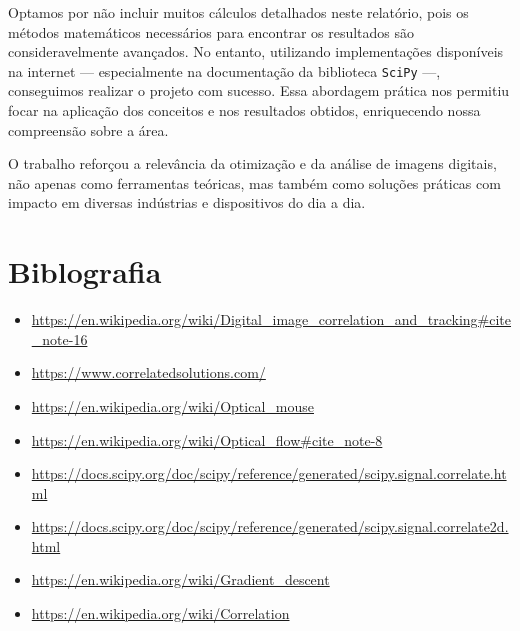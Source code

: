 \documentclass[a4paper,12pt]{article}
\begin{document}
Optamos por não incluir muitos cálculos detalhados neste relatório, pois os métodos matemáticos necessários para encontrar os resultados são consideravelmente avançados. No entanto, utilizando implementações disponíveis na internet — especialmente na documentação da biblioteca \texttt{SciPy} —, conseguimos realizar o projeto com sucesso. Essa abordagem prática nos permitiu focar na aplicação dos conceitos e nos resultados obtidos, enriquecendo nossa compreensão sobre a área. 

O trabalho reforçou a relevância da otimização e da análise de imagens digitais, não apenas como ferramentas teóricas, mas também como soluções práticas com impacto em diversas indústrias e dispositivos do dia a dia.

\section{Biblografia}
\begin{itemize}
    \item \url{https://en.wikipedia.org/wiki/Digital_image_correlation_and_tracking#cite_note-16}
    \item \url{https://www.correlatedsolutions.com/}
    \item \url{https://en.wikipedia.org/wiki/Optical_mouse}
    \item \url{https://en.wikipedia.org/wiki/Optical_flow#cite_note-8}
    \item \url{https://docs.scipy.org/doc/scipy/reference/generated/scipy.signal.correlate.html}
    \item \url{https://docs.scipy.org/doc/scipy/reference/generated/scipy.signal.correlate2d.html}
    \item \url{https://en.wikipedia.org/wiki/Gradient_descent}
    \item \url{https://en.wikipedia.org/wiki/Correlation}
\end{itemize}
\end{document}
